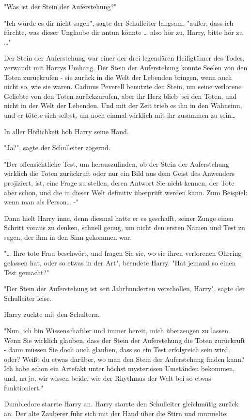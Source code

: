 {"Was ist der Stein der Auferstehung?"

"Ich würde es dir nicht sagen", sagte der Schulleiter langsam, "außer, dass ich fürchte, was dieser Unglaube dir antun könnte … also hör zu, Harry, bitte hör zu …"

Der Stein der Auferstehung war einer der drei legendären Heiligtümer des Todes, verwandt mit Harrys Umhang. Der Stein der Auferstehung konnte Seelen von den Toten zurückrufen - sie zurück in die Welt der Lebenden bringen, wenn auch nicht so, wie sie waren. Cadmus Peverell benutzte den Stein, um seine verlorene Geliebte von den Toten zurückzurufen, aber ihr Herz blieb bei den Toten, und nicht in der Welt der Lebenden. Und mit der Zeit trieb es ihn in den Wahnsinn, und er tötete sich selbst, um noch einmal wirklich mit ihr zusammen zu sein…

In aller Höflichkeit hob Harry seine Hand.

"Ja?", sagte der Schulleiter zögernd.

"Der offensichtliche Test, um herauszufinden, ob der Stein der Auferstehung wirklich die Toten zurückruft oder nur ein Bild aus dem Geist des Anwenders projiziert, ist, eine Frage zu stellen, deren Antwort Sie nicht kennen, der Tote aber schon, und die in dieser Welt definitiv überprüft werden kann. Zum Beispiel: wenn man als Person… -"

Dann hielt Harry inne, denn diesmal hatte er es geschafft, seiner Zunge einen Schritt voraus zu denken, schnell genug, um nicht den ersten Namen und Test zu sagen, der ihm in den Sinn gekommen war.

"… Ihre tote Frau beschwört, und fragen Sie sie, wo sie ihren verlorenen Ohrring gelassen hat, oder so etwas in der Art", beendete Harry. "Hat jemand so einen Test gemacht?"

"Der Stein der Auferstehung ist seit Jahrhunderten verschollen, Harry", sagte der Schulleiter leise.

Harry zuckte mit den Schultern.

"Nun, ich bin Wissenschaftler und immer bereit, mich überzeugen zu lassen. Wenn Sie wirklich glauben, dass der Stein der Auferstehung die Toten zurückruft - dann müssen Sie doch auch glauben, dass so ein Test erfolgreich sein wird, oder? Weißt du etwas darüber, wo man den Stein der Auferstehung finden kann? Ich habe schon ein Artefakt unter höchst mysteriösen Umständen bekommen, und, na ja, wir wissen beide, wie der Rhythmus der Welt bei so etwas funktioniert."

Dumbledore starrte Harry an. Harry starrte den Schulleiter gleichmütig zurück an. Der alte Zauberer fuhr sich mit der Hand über die Stirn und murmelte:

}
